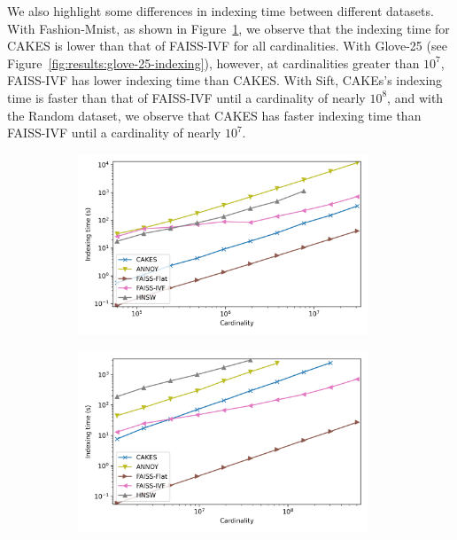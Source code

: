 We also highlight some differences in indexing time between different datasets.
With Fashion-Mnist, as shown in Figure~\ref{fig:results:fashion-mnist-indexing}, we observe that the indexing time for CAKES is lower than that of FAISS-IVF for all cardinalities.
With Glove-25 (see Figure~\ref{fig:results:glove-25-indexing}), however, at cardinalities greater than $10^7$, FAISS-IVF has lower indexing time than CAKES.
With Sift, CAKEs's indexing time is faster than that of FAISS-IVF until a cardinality of nearly $10^8$, and with the Random dataset, we observe that CAKES has faster indexing time than FAISS-IVF until a cardinality of nearly $10^7$.


\begin{figure}
    \begin{subfigure}[b]{0.47\textwidth}
        \includegraphics[width=0.95\textwidth]{plots/fashion-mnist-indexing.png}\\
        \label{fig:results:fashion-mnist-indexing}
    \end{subfigure}%
    \begin{subfigure}[b]{0.47\textwidth}
        \includegraphics[width=0.95\textwidth]{plots/glove-25-indexing.png}\\

\end{subfigure}
\end{figure}
